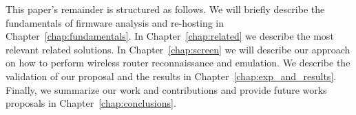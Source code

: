 This paper's remainder is structured as follows. We will briefly describe the fundamentals of firmware analysis and re-hosting in Chapter~\ref{chap:fundamentals}. In Chapter~\ref{chap:related} we describe the most relevant related solutions. In Chapter~\ref{chap:screen} we will describe our approach on how to perform wireless router reconnaissance and emulation. We describe the validation of our proposal and the results in Chapter~\ref{chap:exp_and_results}. Finally, we summarize our work and contributions and provide future works proposals in Chapter~\ref{chap:conclusions}.
